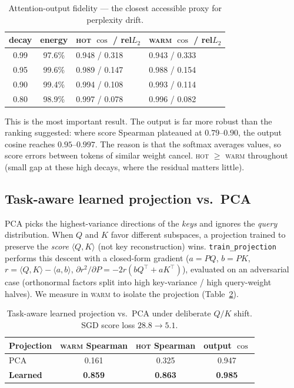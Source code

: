 \documentclass[11pt]{article}
\theoremstyle{plain}
\theoremstyle{definition}
\newcommand{\inner}[2]{\langle #1, #2 \rangle}
\begin{document}
\begin{table}[t]
\centering
\caption{Attention-output fidelity --- the closest accessible proxy for
perplexity drift.}
\label{tab:output}
\small
\begin{tabular}{@{}ccll@{}}
\toprule
decay & energy & \textsc{hot} $\cos$ / rel$L_2$ & \textsc{warm} $\cos$ / rel$L_2$ \\
\midrule
0.99 & 97.6\% & 0.948 / 0.318 & 0.943 / 0.333 \\
0.95 & 99.6\% & 0.989 / 0.147 & 0.988 / 0.154 \\
0.90 & 99.4\% & 0.994 / 0.108 & 0.993 / 0.114 \\
0.80 & 98.9\% & 0.997 / 0.078 & 0.996 / 0.082 \\
\bottomrule
\end{tabular}
\end{table}

This is the most important result. The output is far more robust than
the ranking suggested: where score Spearman plateaued at $0.79$--$0.90$,
the output cosine reaches $0.95$--$0.997$. The reason is that the softmax
averages values, so score errors between tokens of similar weight cancel.
\textsc{hot} $\ge$ \textsc{warm} throughout (small gap at these high
decays, where the residual matters little).

\subsection{Task-aware learned projection vs.\ PCA}
\label{sec:taskaware}
PCA picks the highest-variance directions of the \emph{keys} and ignores
the \emph{query} distribution. When $Q$ and $K$ favor different
subspaces, a projection trained to preserve the \emph{score}
$\inner{Q}{K}$ (not key reconstruction) wins. \texttt{train\_projection}
performs this descent with a closed-form gradient
($a=PQ$, $b=PK$, $r=\inner{Q}{K}-\inner{a}{b}$,
$\partial r^2/\partial P = -2r(bQ^\top + aK^\top)$), evaluated on an
adversarial case (orthonormal factors split into high key-variance /
high query-weight halves). We measure in \textsc{warm} to isolate the
projection (Table~\ref{tab:taskaware}).

\begin{table}[t]
\centering
\caption{Task-aware learned projection vs.\ PCA under deliberate $Q/K$
shift. SGD score loss $28.8 \to 5.1$.}
\label{tab:taskaware}
\small
\begin{tabular}{@{}lccc@{}}
\toprule
Projection & \textsc{warm} Spearman & \textsc{hot} Spearman & output $\cos$ \\
\midrule
PCA            & 0.161 & 0.325 & 0.947 \\
\textbf{Learned} & \textbf{0.859} & \textbf{0.863} & \textbf{0.985} \\
\bottomrule
\end{tabular}
\end{table}
\end{document}
